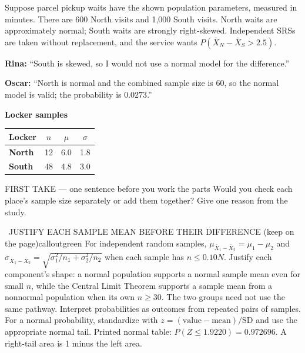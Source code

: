 \documentclass[11pt]{article}
\begin{document}


Suppose parcel pickup waits have the shown population parameters, measured in minutes. There are 600 North visits and 1,000 South visits. North waits are approximately normal; South waits are strongly right-skewed. Independent SRSs are taken without replacement, and the service wants $P(\bar X_N-\bar X_S>2.5)$.\par\smallskip \textbf{Rina:} ``South is skewed, so I would not use a normal model for the difference.''\par \textbf{Oscar:} ``North is normal and the combined sample size is 60, so the normal model is valid; the probability is $0.0273$.''\par
\begin{center}
\textbf{Locker samples}\par\smallskip
\begin{tabular}{|l|c|c|c|}
\hline
\textbf{Locker} & \textbf{$n$} & \textbf{$\mu$} & \textbf{$\sigma$} \\ \hline
\textbf{North} & 12 & 6.0 & 1.8 \\ \hline
\textbf{South} & 48 & 4.8 & 3.0 \\ \hline
\end{tabular}
\end{center}
\begin{firsttakebox}{FIRST TAKE --- one sentence before you work the parts}
Would you check each place's sample size separately or add them together? Give one reason from the study.
\workspace{0.9in}
\end{firsttakebox}

\begin{callout}{\IconBook\ JUSTIFY EACH SAMPLE MEAN BEFORE THEIR DIFFERENCE (keep on the page)}{calloutgreen}
For independent random samples, $\mu_{\bar X_1-\bar X_2}=\mu_1-\mu_2$ and
$\sigma_{\bar X_1-\bar X_2}=\sqrt{\sigma_1^2/n_1+\sigma_2^2/n_2}$ when each
sample has $n\leq0.10N$. Justify each component's shape: a normal population
supports a normal sample mean even for small $n$, while the Central Limit Theorem supports
a sample mean from a nonnormal population when its own $n\geq30$. The two groups need not
use the same pathway. Interpret probabilities as outcomes from repeated pairs of samples.
For a normal probability, standardize with $z=(\text{value}-\text{mean})/\text{SD}$ and use the appropriate normal tail.
Printed normal table: $P(Z\leq1.9220)=0.972696$. A right-tail area is 1 minus the left area.
\end{callout}
\end{document}
